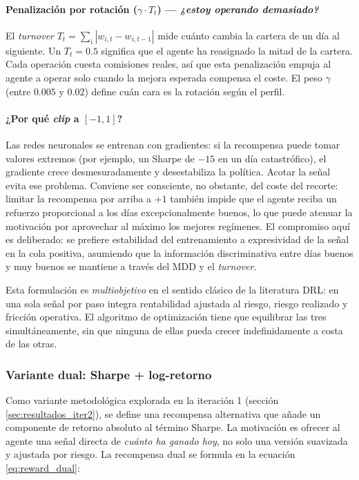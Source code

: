 \documentclass[IB,a4paper]{TFUOC}
\begin{document}
\paragraph{Penalización por rotación ($\gamma \cdot T_t$) — \textit{¿estoy operando demasiado?}} El \textit{turnover} $T_t = \sum_i |w_{i,t} - w_{i,t-1}|$ mide cuánto cambia la cartera de un día al siguiente. Un $T_t = 0.5$ significa que el agente ha reasignado la mitad de la cartera. Cada operación cuesta comisiones reales, así que esta penalización empuja al agente a operar solo cuando la mejora esperada compensa el coste. El peso $\gamma$ (entre $0.005$ y $0.02$) define cuán cara es la rotación según el perfil.

\paragraph{¿Por qué \textit{clip} a $[-1, 1]$?} Las redes neuronales se entrenan con gradientes: si la recompensa puede tomar valores extremos (por ejemplo, un Sharpe de $-15$ en un día catastrófico), el gradiente crece desmesuradamente y desestabiliza la política. Acotar la señal evita ese problema. Conviene ser consciente, no obstante, del coste del recorte: limitar la recompensa por arriba a $+1$ también impide que el agente reciba un refuerzo proporcional a los días excepcionalmente buenos, lo que puede atenuar la motivación por aprovechar al máximo los mejores regímenes. El compromiso aquí es deliberado: se prefiere estabilidad del entrenamiento a expresividad de la señal en la cola positiva, asumiendo que la información discriminativa entre días buenos y muy buenos se mantiene a través del MDD y el \textit{turnover}.

Esta formulación es \textit{multiobjetivo} en el sentido clásico de la literatura DRL: en una sola señal por paso integra rentabilidad ajustada al riesgo, riesgo realizado y fricción operativa. El algoritmo de optimización tiene que equilibrar las tres simultáneamente, sin que ninguna de ellas pueda crecer indefinidamente a costa de las otras.

\subsubsection*{Variante dual: Sharpe + log-retorno}

Como variante metodológica explorada en la iteración 1 (sección \ref{sec:resultados_iter2}), se define una recompensa alternativa que añade un componente de retorno absoluto al término Sharpe. La motivación es ofrecer al agente una señal directa de \emph{cuánto ha ganado hoy}, no solo una versión suavizada y ajustada por riesgo. La recompensa dual se formula en la ecuación \eqref{eq:reward_dual}:
\end{document}
